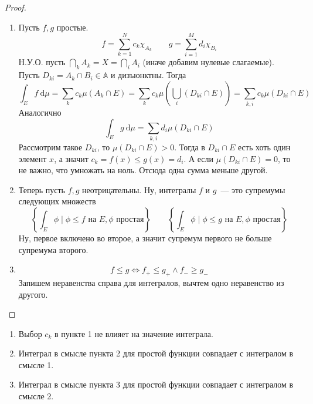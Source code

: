 \documentclass{article}
\begin{document}
    \begin{proof}
        \begin{enumerate}
            \item Пусть $f,g$ простые.
            $$
            f=\sum\limits_{k=1}^Nc_k\chi_{A_k}\qquad g=\sum\limits_{i=1}^Md_i\chi_{B_i}
            $$
            Н.У.О. пусть $\bigcap\limits_k A_k=X=\bigcap\limits_i A_i$ (иначе добавим нулевые слагаемые).\\
            Пусть $D_{ki}=A_k\cap B_i\in\mathbb A$ и дизъюнктны. Тогда
            $$
            \int_E f~\mathrm d\mu=\sum\limits_k c_k\mu(A_k\cap E)=\sum\limits_k c_k\mu\left(\bigcup\limits_i(D_{ki}\cap E)\right)=\sum\limits_{k,i} c_k\mu(D_{ki}\cap E)
            $$
            Аналогично
            $$
            \int_E g~\mathrm d\mu=\sum\limits_{k,i} d_i\mu(D_{ki}\cap E)
            $$
            Рассмотрим такое $D_{ki}$, то $\mu(D_{ki}\cap E)>0$. Тогда в $D_{ki}\cap E$ есть хоть один элемент $x$, а значит $c_k=f(x)\leqslant g(x)=d_i$. А если $\mu(D_{ki}\cap E)=0$, то не важно, что умножать на ноль. Отсюда одна сумма меньше другой.
            \item Теперь пусть $f,g$ неотрицательны. Ну, интегралы $f$ и $g$~--- это супремумы следующих множеств
            $$
            \left\{\int_E\phi\mid\phi\leqslant f\text{ на }E,\phi\text{ простая}\right\}\qquad\left\{\int_E\phi\mid\phi\leqslant g\text{ на }E,\phi\text{ простая}\right\}
            $$
            Ну, первое включено во второе, а значит супремум первого не больше супремума второго.
            \item
            $$
            f\leqslant g\Leftrightarrow f_+\leqslant g_+\land f_-\geqslant g_-
            $$
            Запишем неравенства справа для интегралов, вычтем одно неравенство из другого.
        \end{enumerate}
    \end{proof}
    \begin{theorem}
        \begin{enumerate}
            \item Выбор $c_k$ в пункте 1 не влияет на значение интеграла.
            \item Интеграл в смысле пункта 2 для простой функции совпадает с интегралом в смысле 1.
            \item Интеграл в смысле пункта 3 для простой функции совпадает с интегралом в смысле 2.
        \end{enumerate}
    \end{theorem}
\end{document}
